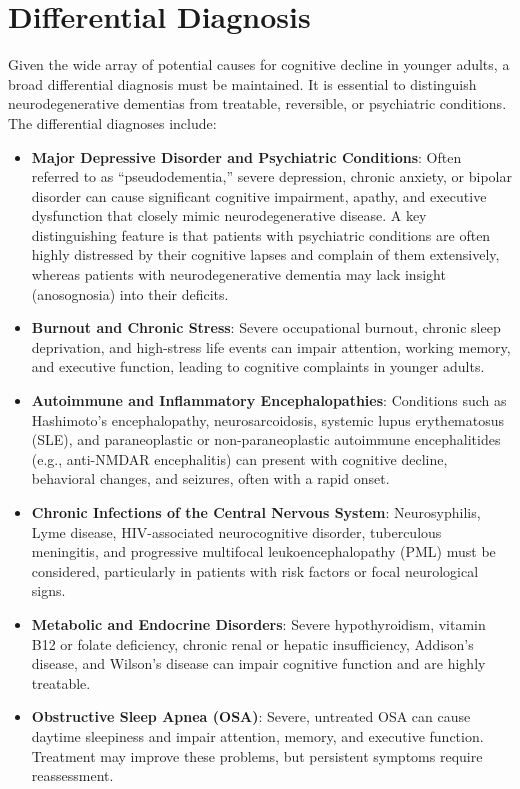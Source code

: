 \section*{Differential Diagnosis}
Given the wide array of potential causes for cognitive decline in younger adults, a broad differential diagnosis must be maintained. It is essential to distinguish neurodegenerative dementias from treatable, reversible, or psychiatric conditions. The differential diagnoses include:

\begin{itemize}
    \item \textbf{Major Depressive Disorder and Psychiatric Conditions}: Often referred to as ``pseudodementia,'' severe depression, chronic anxiety, or bipolar disorder can cause significant cognitive impairment, apathy, and executive dysfunction that closely mimic neurodegenerative disease. A key distinguishing feature is that patients with psychiatric conditions are often highly distressed by their cognitive lapses and complain of them extensively, whereas patients with neurodegenerative dementia may lack insight (anosognosia) into their deficits.
    \item \textbf{Burnout and Chronic Stress}: Severe occupational burnout, chronic sleep deprivation, and high-stress life events can impair attention, working memory, and executive function, leading to cognitive complaints in younger adults.
    \item \textbf{Autoimmune and Inflammatory Encephalopathies}: Conditions such as Hashimoto's encephalopathy, neurosarcoidosis, systemic lupus erythematosus (SLE), and paraneoplastic or non-paraneoplastic autoimmune encephalitides (e.g., anti-NMDAR encephalitis) can present with cognitive decline, behavioral changes, and seizures, often with a rapid onset.
    \item \textbf{Chronic Infections of the Central Nervous System}: Neurosyphilis, Lyme disease, HIV-associated neurocognitive disorder, tuberculous meningitis, and progressive multifocal leukoencephalopathy (PML) must be considered, particularly in patients with risk factors or focal neurological signs.
    \item \textbf{Metabolic and Endocrine Disorders}: Severe hypothyroidism, vitamin B12 or folate deficiency, chronic renal or hepatic insufficiency, Addison's disease, and Wilson's disease can impair cognitive function and are highly treatable.
    \item \textbf{Obstructive Sleep Apnea (OSA)}: Severe, untreated OSA can cause daytime sleepiness and impair attention, memory, and executive function. Treatment may improve these problems, but persistent symptoms require reassessment.

\end{itemize}
